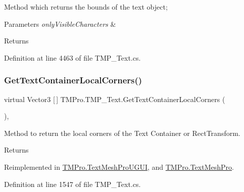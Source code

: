 Method which returns the bounds of the text object; 


\begin{DoxyParams}{Parameters}
{\em only\+Visible\+Characters} & \\
\hline
\end{DoxyParams}
\begin{DoxyReturn}{Returns}

\end{DoxyReturn}


Definition at line 4463 of file T\+M\+P\+\_\+\+Text.\+cs.

\mbox{\label{class_t_m_pro_1_1_t_m_p___text_aad195b1745c7631eaed1376b554a64b9}} 
\subsubsection{\texorpdfstring{GetTextContainerLocalCorners()}{GetTextContainerLocalCorners()}}
{\footnotesize\ttfamily virtual Vector3 \mbox{[}$\,$\mbox{]} T\+M\+Pro.\+T\+M\+P\+\_\+\+Text.\+Get\+Text\+Container\+Local\+Corners (\begin{DoxyParamCaption}{ }\end{DoxyParamCaption})\hspace{0.3cm}{\ttfamily [protected]}, {\ttfamily [virtual]}}



Method to return the local corners of the Text Container or Rect\+Transform. 

\begin{DoxyReturn}{Returns}

\end{DoxyReturn}


Reimplemented in \mbox{\hyperlink{class_t_m_pro_1_1_text_mesh_pro_u_g_u_i_a9061f9387fbed4095b88a7ad98a9bf90}{T\+M\+Pro.\+Text\+Mesh\+Pro\+U\+G\+UI}}, and \mbox{\hyperlink{class_t_m_pro_1_1_text_mesh_pro_ab19c47a7d65e5e1201978568ed1af0d5}{T\+M\+Pro.\+Text\+Mesh\+Pro}}.



Definition at line 1547 of file T\+M\+P\+\_\+\+Text.\+cs.

\mbox{\label{class_t_m_pro_1_1_t_m_p___text_a6818c7aebeca52a9e5205ec1225481c6}} 
